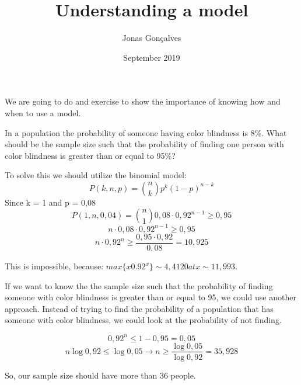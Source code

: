 \documentclass{article}
\title{Understanding a model}
\author{Jonas Gonçalves}
\date{September 2019}
\newcommand{\p}{0,08}
\newcommand{\q}{0,92}
\newcommand{\pr}{0,95}
\newcommand{\rp}{0,05}
\begin{document}
\maketitle

We are going to do and exercise to show the importance of knowing how and when to use a model.

In a population the probability of someone having color blindness is 8\%. What should be the sample size such that the probability of finding one person with color blindness is greater than or equal to 95\%?
 
To solve this we should utilize the binomial model:
\begin{equation}
    P(k,n,p) = {n\choose k} p^k (1-p)^{n-k}
\end{equation}
Since k = 1 and p = 0,08
    \[P(1,n, 0,04) = {n \choose 1} \p \cdot \q^{n-1} \ge \pr\]
    \[n\cdot \p \cdot \q^{n-1} \ge \pr\]
    \[n\cdot \q^n \ge \frac{\pr\cdot \q}{\p} = 10,925\]
    
This is impossible, because: \(max\{x 0.92^x\} \sim 4,4120 at x \sim 11,993\). \bigskip

If we want to know the the sample size such that the probability of finding someone with color blindness is greater than or equal to 95, we could use another approach. Instead of trying to find the probability of a population that has someone with color blindness, we could look at the probability of not finding.

    \[\q^n \le 1  - \pr = \rp\]
    \[n\log{\q} \le \log{\rp} \to n \ge \frac{\log{\rp}}{\log{\q}} = 35,928\]

So, our sample size should have more than 36 people.
\end{document}
